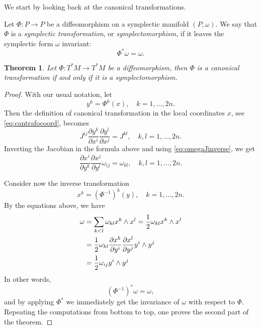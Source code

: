 \documentclass[english,fontsize=11pt,paper=a5,oneside]{scrbook}
\let\d\relax
\newcommand{\d}{\mathrm{d}}
\newtheorem{theorem}{Theorem}[chapter]
\theoremstyle{definition}
\begin{document}
We start by looking back at the canonical transformations.

\begin{tcolorbox}
  Let $\Phi: P \to P$ be a diffeomorphism on a symplectic manifold $(P,\omega)$.
  We say that $\Phi$ is a \emph{symplectic transformation}, or \emph{symplectomorphism}, if it leaves the symplectic form $\omega$ invariant:
  \begin{equation}\label{eq:symplectomorphism}
    \Phi^* \omega = \omega.
  \end{equation}
\end{tcolorbox}

\begin{theorem}\label{thm:ctiffs}
  Let $\Phi: T^*M \to T^*M$ be a diffeomorphism, then $\Phi$ is a canonical transformation if and only if it is a symplectomorphism.
\end{theorem}
\begin{proof}
  With our usual notation, let
  \begin{equation}
    y^k = \Phi^k(x),\quad k=1,\ldots,2n.
  \end{equation}
  Then the definition of canonical transformation in the local coordinates $x$, see \eqref{eq:cantrafocoord}, becomes
  \begin{equation}
    J^{ij}\frac{\partial y^k}{\partial x^i}\frac{\partial y^l}{\partial x^j} = J^{kl},
    \quad k,l = 1,\ldots,2n.
  \end{equation}
  Inverting the Jacobian in the formula above and using \eqref{eq:omegaJinverse}, we get
  \begin{equation}
    \frac{\partial x^i}{\partial y^k}\frac{\partial x^j}{\partial y^l} \omega_{ij}= \omega_{kl},
    \quad k,l = 1,\ldots,2n.
  \end{equation}

  Consider now the inverse transformation
  \begin{equation}
    x^k = \left(\Phi^{-1}\right)^k(y),\quad k=1,\ldots,2n.
  \end{equation}
  By the equations above, we have
  \begin{align}
    \omega
     & = \sum_{k<l} \omega_{kl}\d x^k \wedge \d x^l
    = \frac12 \omega_{kl} \d x^k \wedge \d x^l                                                                       \\
     & = \frac12 \omega_{kl} \frac{\partial x^k}{\partial y^i}\frac{\partial x^l}{\partial y^j} \d y^i \wedge \d y^j \\
     & = \frac12 \omega_{ij} \d y^i \wedge \d y^j
  \end{align}
  In other words,
  \begin{equation}
    \left(\Phi^{-1}\right)^* \omega = \omega,
  \end{equation}
  and by applying $\Phi^*$ we immediately get the invariance of $\omega$ with respect to $\Phi$.
  Repeating the computations from bottom to top, one proves the second part of the theorem.
\end{proof}
\end{document}
